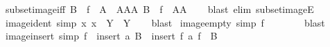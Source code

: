 \begin{isabellebody}
\isamarkupfalse%
%
\endisatagproof
{\isafoldproof}%
%
\isadelimproof
\isanewline
%
\endisadelimproof
\isanewline
{}\isamarkupfalse%
\ subset{\isacharunderscore}{\kern0pt}image{\isacharunderscore}{\kern0pt}iff{\isacharcolon}{\kern0pt}\ {\isachardoublequoteopen}B\ {\isasymsubseteq}\ f\ {\isacharbackquote}{\kern0pt}\ A\ {\isasymlongleftrightarrow}\ {\isacharparenleft}{\kern0pt}{\isasymexists}AA{\isasymsubseteq}A{\isachardot}{\kern0pt}\ B\ {\isacharequal}{\kern0pt}\ f\ {\isacharbackquote}{\kern0pt}\ AA{\isacharparenright}{\kern0pt}{\isachardoublequoteclose}\isanewline
%
\isadelimproof
\ \ %
\endisadelimproof
%
\isatagproof
{}\isamarkupfalse%
\ {\isacharparenleft}{\kern0pt}blast\ elim{\isacharcolon}{\kern0pt}\ subset{\isacharunderscore}{\kern0pt}imageE{\isacharparenright}{\kern0pt}%
\endisatagproof
{\isafoldproof}%
%
\isadelimproof
\isanewline
%
\endisadelimproof
\isanewline
{}\isamarkupfalse%
\ image{\isacharunderscore}{\kern0pt}ident\ {\isacharbrackleft}{\kern0pt}simp{\isacharbrackright}{\kern0pt}{\isacharcolon}{\kern0pt}\ {\isachardoublequoteopen}{\isacharparenleft}{\kern0pt}{\isasymlambda}x{\isachardot}{\kern0pt}\ x{\isacharparenright}{\kern0pt}\ {\isacharbackquote}{\kern0pt}\ Y\ {\isacharequal}{\kern0pt}\ Y{\isachardoublequoteclose}\isanewline
%
\isadelimproof
\ \ %
\endisadelimproof
%
\isatagproof
{}\isamarkupfalse%
\ blast%
\endisatagproof
{\isafoldproof}%
%
\isadelimproof
\isanewline
%
\endisadelimproof
\isanewline
{}\isamarkupfalse%
\ image{\isacharunderscore}{\kern0pt}empty\ {\isacharbrackleft}{\kern0pt}simp{\isacharbrackright}{\kern0pt}{\isacharcolon}{\kern0pt}\ {\isachardoublequoteopen}f\ {\isacharbackquote}{\kern0pt}\ {\isacharbraceleft}{\kern0pt}{\isacharbraceright}{\kern0pt}\ {\isacharequal}{\kern0pt}\ {\isacharbraceleft}{\kern0pt}{\isacharbraceright}{\kern0pt}{\isachardoublequoteclose}\isanewline
%
\isadelimproof
\ \ %
\endisadelimproof
%
\isatagproof
{}\isamarkupfalse%
\ blast%
\endisatagproof
{\isafoldproof}%
%
\isadelimproof
\isanewline
%
\endisadelimproof
\isanewline
{}\isamarkupfalse%
\ image{\isacharunderscore}{\kern0pt}insert\ {\isacharbrackleft}{\kern0pt}simp{\isacharbrackright}{\kern0pt}{\isacharcolon}{\kern0pt}\ {\isachardoublequoteopen}f\ {\isacharbackquote}{\kern0pt}\ insert\ a\ B\ {\isacharequal}{\kern0pt}\ insert\ {\isacharparenleft}{\kern0pt}f\ a{\isacharparenright}{\kern0pt}\ {\isacharparenleft}{\kern0pt}f\ {\isacharbackquote}{\kern0pt}\ B{\isacharparenright}{\kern0pt}{\isachardoublequoteclose}\isanewline
%
\isadelimproof

\end{isabellebody}
